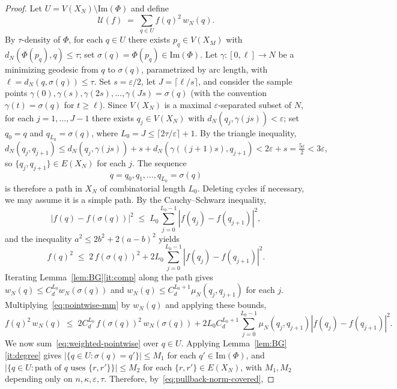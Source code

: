 \documentclass[10pt,reqno]{amsart}
\theoremstyle{remark}
\begin{document}
\begin{proof}
Let $U=V(X_N)\setminus\mathrm{Im}(\Phi)$ and define
\[
  \mathcal{U}(f)\;=\;\sum_{q\in U}f(q)^2\,w_N(q).
\]
By $\tau$-density of $\Phi$, for each $q \in U$ there exists
$p_q \in V(X_M)$ with $d_N(\Phi(p_q), q) \le \tau$; set
$\sigma(q) = \Phi(p_q) \in \mathrm{Im}(\Phi)$. Let
$\gamma : [0, \ell] \to N$ be a minimizing geodesic from $q$ to
$\sigma(q)$, parametrized by arc length, with
$\ell = d_N(q, \sigma(q)) \le \tau$. Set $s = \varepsilon/2$, let
$J = \lceil \ell/s \rceil$, and consider the sample points
$\gamma(0), \gamma(s), \gamma(2s), \ldots, \gamma(Js) = \sigma(q)$
(with the convention $\gamma(t) = \sigma(q)$ for $t \ge \ell$).
Since $V(X_N)$ is a maximal $\varepsilon$-separated subset of $N$,
for each $j = 1, \ldots, J-1$ there exists $q_j \in V(X_N)$ with
$d_N(q_j, \gamma(js)) < \varepsilon$; set $q_0 = q$ and
$q_{L_0} = \sigma(q)$, where $L_0 = J \le \lceil 2\tau/\varepsilon \rceil + 1$.
By the triangle inequality,
\[
  d_N(q_j, q_{j+1})
  \le d_N(q_j, \gamma(js)) + s + d_N(\gamma((j+1)s), q_{j+1})
  < 2\varepsilon + s
  = \tfrac{5\varepsilon}{2}
  < 3\varepsilon,
\]
so $\{q_j, q_{j+1}\} \in E(X_N)$ for each $j$. The sequence
\[
  q = q_0, q_1, \ldots, q_{L_0} = \sigma(q)
\]
is therefore a path in $X_N$ of combinatorial length $L_0$.
Deleting cycles if necessary, we may assume it is a simple path. By the Cauchy--Schwarz inequality,
\[
  |f(q)-f(\sigma(q))|^2
  \;\leq\;
  L_0\sum_{j=0}^{L_0-1}|f(q_j)-f(q_{j+1})|^2,
\]
and the inequality $a^2\leq 2b^2+2(a-b)^2$ yields
\begin{equation}
\label{eq:pointwise-mm}
  f(q)^2
  \;\leq\;
  2\,f(\sigma(q))^2
  +
  2L_0\sum_{j=0}^{L_0-1}|f(q_j)-f(q_{j+1})|^2.
\end{equation}
Iterating Lemma~\ref{lem:BG}\ref{it:comp} along the path gives
$w_N(q)\leq C_d^{L_0}w_N(\sigma(q))$ and
$w_N(q)\leq C_d^{L_0+1}\mu_N(q_j,q_{j+1})$ for each $j$.
Multiplying~\eqref{eq:pointwise-mm} by $w_N(q)$ and applying these
bounds,
\begin{equation}
\label{eq:weighted-pointwise}
  f(q)^2\,w_N(q)
  \;\leq\;
  2C_d^{L_0}\,f(\sigma(q))^2\,w_N(\sigma(q))
  +
  2L_0 C_d^{L_0+1}\sum_{j=0}^{L_0-1}\mu_N(q_j,q_{j+1})|f(q_j)-f(q_{j+1})|^2.
\end{equation}
We now sum~\eqref{eq:weighted-pointwise} over $q\in U$. Applying Lemma~\ref{lem:BG}\ref{it:degree} gives
$|\{q \in U : \sigma(q) = q'\}| \le M_1$ for each $q' \in \mathrm{Im}(\Phi)$,
and $|\{q \in U : \text{path of } q \text{ uses } \{r, r'\}\}| \le M_2$
for each $\{r, r'\} \in E(X_N)$, with $M_1, M_2$ depending only on
$n, \kappa, \varepsilon, \tau$. Therefore, by~\eqref{eq:pullback-norm-covered},

\end{proof}
\end{document}
